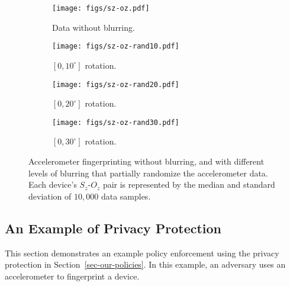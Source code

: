 \begin{figure*}
\centering
\begin{subfigure}[b]{.25\textwidth}
  \centering
  \texttt{[image: figs/sz-oz.pdf]}
  \caption{Data without blurring.}
  \label{fig:sub1}
\end{subfigure}%
\begin{subfigure}[b]{.25\textwidth}
  \centering
  \texttt{[image: figs/sz-oz-rand10.pdf]}
  \caption{$[0, 10^{\circ}]$ rotation.}
  \label{fig:sub2}
\end{subfigure}%
\begin{subfigure}[b]{.25\textwidth}
  \centering
  \texttt{[image: figs/sz-oz-rand20.pdf]}
  \caption{$[0, 20^{\circ}]$ rotation.}
  \label{fig:sub3}
\end{subfigure}%
\begin{subfigure}[b]{.25\textwidth}
  \centering
  \texttt{[image: figs/sz-oz-rand30.pdf]}
  \caption{$[0, 30^{\circ}]$ rotation.}
  \label{fig:sub3}
\end{subfigure}%

\caption{\small Accelerometer fingerprinting without blurring, and with different levels of 
blurring that partially randomize the accelerometer data. Each device's $S_z$-$O_z$
pair is represented by the median and standard deviation of $10,000$ data samples.
}

\label{fig:fingerprinting}
\end{figure*}

\subsection{An Example of Privacy Protection}\label{sec-experiment}

This section demonstrates an example policy enforcement using the 
privacy protection in Section~\ref{sec-our-policies}. In this example, an 
adversary uses an accelerometer to fingerprint a device. 


